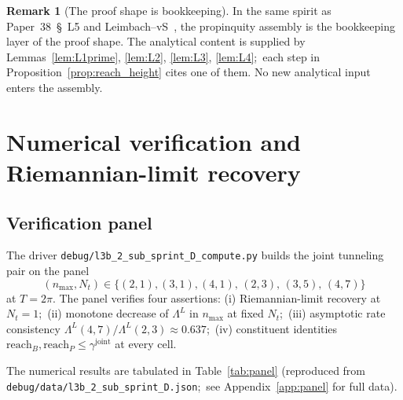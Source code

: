 \documentclass[11pt,a4paper]{article}
\theoremstyle{plain}
\theoremstyle{definition}
\newtheorem{remark}[theorem]{Remark}
\newcommand{\nmax}{n_{\max}}
\newcommand{\Nt}{N_{t}}
\newcommand{\Lprop}{\Lambda^{L}}
\newcommand{\gammajoint}{\gamma^{\mathrm{joint}}}
\begin{document}
\begin{remark}[The proof shape is bookkeeping]\label{rem:bookkeeping}
In the same spirit as Paper~38~\S~L5 and
Leimbach--vS~\cite{leimbach_vs2024}, the propinquity assembly is the
bookkeeping layer of the proof shape. The analytical content is
supplied by Lemmas~\ref{lem:L1prime}, \ref{lem:L2}, \ref{lem:L3},
\ref{lem:L4};\ each step in Proposition~\ref{prop:reach_height} cites
one of them. No new analytical input enters the assembly.
\end{remark}

\section{Numerical verification and Riemannian-limit recovery}
\label{sec:numerical}

\subsection{Verification panel}\label{sec:panel}

The driver \texttt{debug/l3b\_2\_sub\_sprint\_D\_compute.py} builds the
joint tunneling pair on the panel
\begin{equation*}
   (\nmax, \Nt) \in \{(2, 1), (3, 1), (4, 1),\, (2, 3),\, (3, 5),\, (4, 7)\}
\end{equation*}
at $T = 2\pi$. The panel verifies four assertions:
(i) Riemannian-limit recovery at $\Nt = 1$;\
(ii) monotone decrease of $\Lprop$ in $\nmax$ at fixed $\Nt$;\
(iii) asymptotic rate consistency $\Lprop(4, 7) / \Lprop(2, 3) \approx
0.637$;\
(iv) constituent identities
$\mathrm{reach}_{B}, \mathrm{reach}_{P} \le \gammajoint$ at every cell.

The numerical results are tabulated in Table~\ref{tab:panel}
(reproduced from \texttt{debug/data/l3b\_2\_sub\_sprint\_D.json};\ see
Appendix~\ref{app:panel} for full data).
\end{document}
